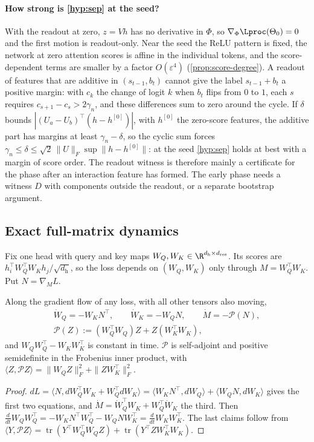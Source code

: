 \paragraph{How strong is \ref{hyp:sep} at the seed?} With the readout at zero, $z=Vh$ has no derivative in $\Phi$, so $\nabla_\Phi\Lproc(\Theta_0)=0$
and the first motion is readout-only. Near the seed the ReLU pattern is fixed, the network at zero attention scores is affine in the
individual tokens, and the score-dependent terms are smaller by a factor $O(\varepsilon^4)$ (\cref{prop:score-degree}). A readout of features that
are additive in $(s_{t-1},b_t)$ cannot give the label $s_{t-1}+b_t$ a positive margin: with $c_k$ the change of logit $k$ when $b_t$ flips
from $0$ to $1$, each $s$ requires $c_{s+1}-c_s>2\gamma_n$, and these differences sum to zero around the cycle. If $\delta$ bounds $|(U_a-U_b)^\top(h-h^{[0]})|$, with $h^{[0]}$ the
zero-score features, the additive part has margins at least $\gamma_n-\delta$, so the cyclic sum forces $\gamma_n\le\delta\le\sqrt2\,\|U\|_F\sup\|h-h^{[0]}\|$:
at the seed \ref{hyp:sep} holds at best with a margin of score order. The readout witness is therefore mainly a certificate for the phase after an interaction feature has formed. The early phase
needs a witness $D$ with components outside the readout, or a separate bootstrap argument.

\subsection{Exact full-matrix dynamics}\label{app:matrix}
Fix one head with query and key maps $W_Q,W_K\in\R^{d_{\mathrm h}\times d_{\mathrm{res}}}$. Its scores are
$h_i^\top W_Q^\top W_Kh_j/\sqrt{d_{\mathrm h}}$, so the loss depends on $(W_Q,W_K)$ only through $M=W_Q^\top W_K$. Put $N=\nabla_ML$.

\begin{proposition}\label{prop:qk-flow}
Along the gradient flow of any loss, with all other tensors also moving,
\begin{equation}\label{eq:qk-flow}
 \begin{gathered}
 \dot W_Q=-W_KN^\top,\qquad \dot W_K=-W_QN,\qquad \dot M=-\mathcal P(N),\\
 \mathcal P(Z):=(W_Q^\top W_Q)Z+Z(W_K^\top W_K),
 \end{gathered}
\end{equation}
and $W_QW_Q^\top-W_KW_K^\top$ is constant in time. $\mathcal P$ is self-adjoint and positive semidefinite in the Frobenius inner product, with
$\langle Z,\mathcal PZ\rangle=\|W_QZ\|_F^2+\|ZW_K^\top\|_F^2$.
\end{proposition}
\begin{proof}
$dL=\langle N,dW_Q^\top W_K+W_Q^\top dW_K\rangle=\langle W_KN^\top,dW_Q\rangle+\langle W_QN,dW_K\rangle$ gives the first two equations, and
$\dot M=\dot W_Q^\top W_K+W_Q^\top\dot W_K$ the third. Then $\frac{d}{dt}W_QW_Q^\top=-W_KN^\top W_Q^\top-W_QNW_K^\top=\frac{d}{dt}W_KW_K^\top$. The last claims follow
from $\langle Y,\mathcal PZ\rangle=\operatorname{tr}(Y^\top W_Q^\top W_QZ)+\operatorname{tr}(Y^\top ZW_K^\top W_K)$.
\end{proof}

